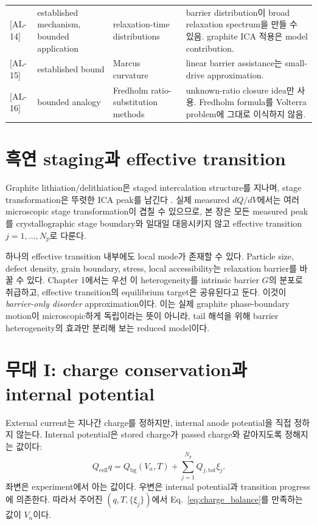 \documentclass[11pt,a4paper]{article}
\newcommand{\bg}{\mathrm{bg}}
\newcommand{\cell}{\mathrm{cell}}
\newcommand{\tot}{\mathrm{tot}}
\newcommand{\AL}[1]{\textsf{[AL-#1]}}
\begin{document}
\begin{longtable}{p{} p{} p{} p{}}
\AL{14} & established mechanism, bounded application & relaxation-time distributions \cite{svare2000,johnston2006,lindsey1980} & barrier distribution이 broad relaxation spectrum을 만들 수 있음. graphite ICA 적용은 model contribution. \\
\AL{15} & established bound & Marcus curvature \cite{marcus1956} & linear barrier assistance는 small-drive approximation. \\
\AL{16} & bounded analogy & Fredholm ratio-substitution methods \cite{lee2011,son2013,jcp2017} & unknown-ratio closure idea만 사용. Fredholm formula를 Volterra problem에 그대로 이식하지 않음. \\
\bottomrule
\end{longtable}

\section{흑연 staging과 effective transition}\label{sec:staging}
Graphite lithiation/delithiation은 staged intercalation structure를 지나며, stage transformation은 뚜렷한 ICA peak를 남긴다
\cite{dahn1991,ohzuku1993,funabiki1999ea,funabiki1999jes}. 실제 measured $dQ/dV$에서는 여러 microscopic stage transformation이
겹칠 수 있으므로, 본 장은 모든 measured peak를 crystallographic stage boundary와 일대일 대응시키지 않고 effective transition
$j=1,\dots,N_p$로 다룬다.

하나의 effective transition 내부에도 local mode가 존재할 수 있다. Particle size, defect density, grain boundary, stress,
local accessibility는 relaxation barrier를 바꿀 수 있다. Chapter 1에서는 우선 이 heterogeneity를 intrinsic barrier $G$의
분포로 취급하고, effective transition의 equilibrium target은 공유된다고 둔다. 이것이 \emph{barrier-only disorder} approximation이다.
이는 실제 graphite phase-boundary motion이 microscopic하게 독립이라는 뜻이 아니라, tail 해석을 위해 barrier heterogeneity의 효과만
분리해 보는 reduced model이다.

\section{무대 I: charge conservation과 internal potential}\label{sec:charge}
External current는 지나간 charge를 정하지만, internal anode potential을 직접 정하지 않는다. Internal potential은 stored charge가
passed charge와 같아지도록 정해지는 값이다:
\begin{equation}
\boxed{\;Q_{\cell}q=Q_{\bg}(V_n,T)+\sum_{j=1}^{N_p}Q_{j,\tot}\xi_j.\;}
\label{eq:charge_balance}
\end{equation}
좌변은 experiment에서 아는 값이다. 우변은 internal potential과 transition progress에 의존한다. 따라서 주어진
$(q,T,\{\xi_j\})$에서 Eq.~\eqref{eq:charge_balance}를 만족하는 값이 $V_n$이다.
\end{document}
